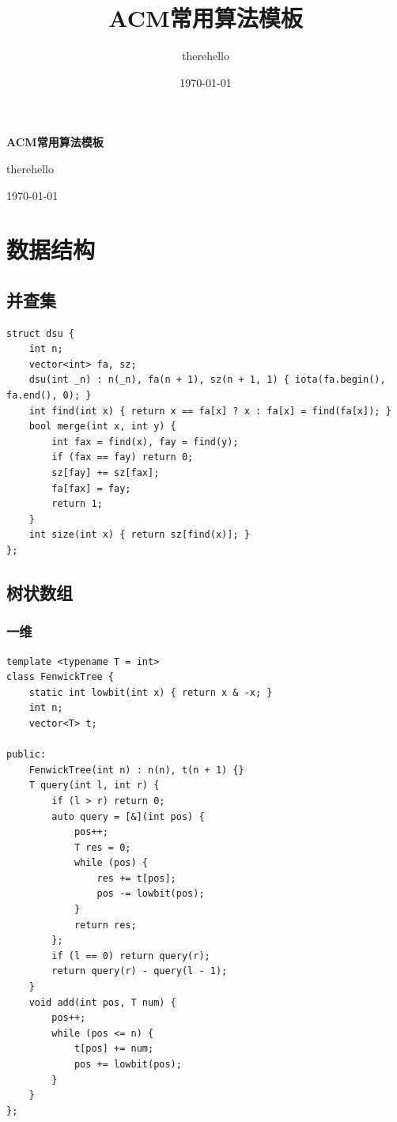 \documentclass[UTF8, twoside]{ctexart}
\title{ACM常用算法模板}
\author{therehello}
\date{\today}
\newcommand\blankpage{
    \null
    \thispagestyle{empty}
    \addtocounter{page}{-1}
    \newpage
}
\begin{document}
\begin{sloppypar}

\begin{titlepage}
    \centering
    {\fontsize{40pt}{0pt}\selectfont \textbf{ACM常用算法模板}\par} %
    \vfill %
    {\fontsize{12pt}{0pt}\selectfont therehello\par} %
    \today %
\end{titlepage}

\blankpage

\tableofcontents

\clearpage

\section{数据结构}

\subsection{并查集}

\begin{lstlisting}[style=cpp]
struct dsu {
    int n;
    vector<int> fa, sz;
    dsu(int _n) : n(_n), fa(n + 1), sz(n + 1, 1) { iota(fa.begin(), fa.end(), 0); }
    int find(int x) { return x == fa[x] ? x : fa[x] = find(fa[x]); }
    bool merge(int x, int y) {
        int fax = find(x), fay = find(y);
        if (fax == fay) return 0;
        sz[fay] += sz[fax];
        fa[fax] = fay;
        return 1;
    }
    int size(int x) { return sz[find(x)]; }
};
\end{lstlisting}

\subsection{树状数组}

\subsubsection{一维}

\begin{lstlisting}[style=cpp]
template <typename T = int>
class FenwickTree {
    static int lowbit(int x) { return x & -x; }
    int n;
    vector<T> t;

public:
    FenwickTree(int n) : n(n), t(n + 1) {}
    T query(int l, int r) {
        if (l > r) return 0;
        auto query = [&](int pos) {
            pos++;
            T res = 0;
            while (pos) {
                res += t[pos];
                pos -= lowbit(pos);
            }
            return res;
        };
        if (l == 0) return query(r);
        return query(r) - query(l - 1);
    }
    void add(int pos, T num) {
        pos++;
        while (pos <= n) {
            t[pos] += num;
            pos += lowbit(pos);
        }
    }
};
\end{lstlisting}


\end{sloppypar}
\end{document}
